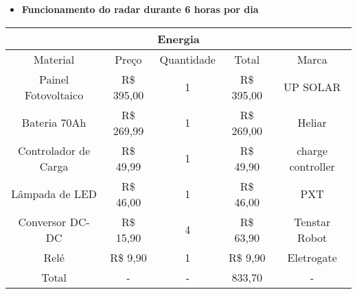 \begin{itemize}
    \item \textbf{Funcionamento do radar durante 6 horas por dia}
\end{itemize}
\begin{table}[H]
\begin{tabular}{|c|c|c|c|c|}
\hline
\multicolumn{5}{|c|}{Energia}                                                 \\ \hline
Material             & Preço         & Quantidade & Total         & Marca     \\ \hline
Painel Fotovoltaico  & R\$ 395,00  & 1          & R\$ 395,00  & UP SOLAR    \\ \hline
Bateria 70Ah              & R\$ 269,99  & 1          & R\$ 269,00  & Heliar  \\ \hline
Controlador de Carga & R\$ 49,99  & 1          & R\$ 49,90  & charge controller \\ \hline
Lâmpada de LED       & R\$ 46,00 & 1          & R\$ 46,00 & PXT         \\ \hline
Conversor DC-DC       & R\$ 15,90 & 4          & R\$ 63,90 & Tenstar Robot         \\ \hline
Relé       & R\$ 9,90 & 1          & R\$ 9,90 & Eletrogate         \\ \hline
Total & - & - & 833,70 & - \\ \hline
\end{tabular}
\end{table}
\vspace*{\fill}
\pagebreak